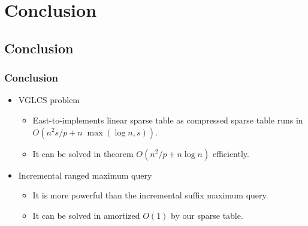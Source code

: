 \section{Conclusion}

\subsection{Conclusion}
\begin{frame}
    \frametitle{Conclusion}
    \begin{itemize}
    	\setlength\itemsep{1em}
    	\item
    		VGLCS problem
    		\begin{itemize}
    			\setlength\itemsep{1em}
    			\item 
    				East-to-implements linear sparse table as compressed
					sparse table runs in $O(n^2 s/p+n\;\max(\log n,
					s))$.
				\item
					It can be solved in theorem $O(n^2/p+n\log n)$
		    		efficiently.
    		\end{itemize}
    	\item
    		Incremental ranged maximum query
    		\begin{itemize}
    			\setlength\itemsep{1em}
    			\item
    				It is more powerful than the incremental suffix
					maximum query.
				\item
					It can be solved in amortized $O(1)$ by our sparse
					table.
    		\end{itemize}
    \end{itemize}
\end{frame}